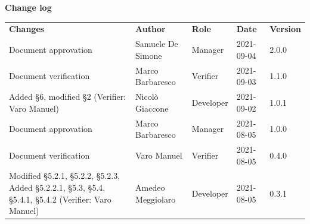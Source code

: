 \documentclass[a4paper]{article}
\begin{document}
\begin{titlepage}
\begin{center}
    \end{center}
\end{titlepage}

\begin{center}
    \textbf{\Large Change log}\\
    \vspace{10px}
    \begin{table}[h!]
        \centering
        \renewcommand{\arraystretch}{1.8}
        \begin{tabular}{p{150px} p{90px} p{80px} p{60px} p{45px}}
            \rowcolor{logo!70} \textbf{Changes}                                                                                                                  & \textbf{Author}   & \textbf{Role} & \textbf{Date} & \textbf{Version} \\
            Document approvation                                                                                                                                 & Samuele De Simone & Manager       & 2021-09-04    & 2.0.0            \\
            Document verification                                                                                                                                & Marco Barbaresco  & Verifier      & 2021-09-03    & 1.1.0            \\
            Added \S{6}, modified \S{2} \newline(Verifier: Varo Manuel)                                                                                          & Nicolò Giaccone   & Developer     & 2021-09-02    & 1.0.1            \\
            Document approvation                                                                                                                                 & Marco Barbaresco  & Manager       & 2021-08-05    & 1.0.0            \\
            Document verification                                                                                                                                & Varo Manuel       & Verifier      & 2021-08-05    & 0.4.0            \\
            Modified \S{5.2.1}, \S{5.2.2}, \S{5.2.3}, Added \S{5.2.2.1}, \S{5.3}, \S{5.4}, \S{5.4.1}, \S{5.4.2} \newline(Verifier: Varo Manuel)                  & Amedeo Meggiolaro & Developer     & 2021-08-05    & 0.3.1            \\

\end{tabular}
\end{table}
\end{center}
\end{document}
